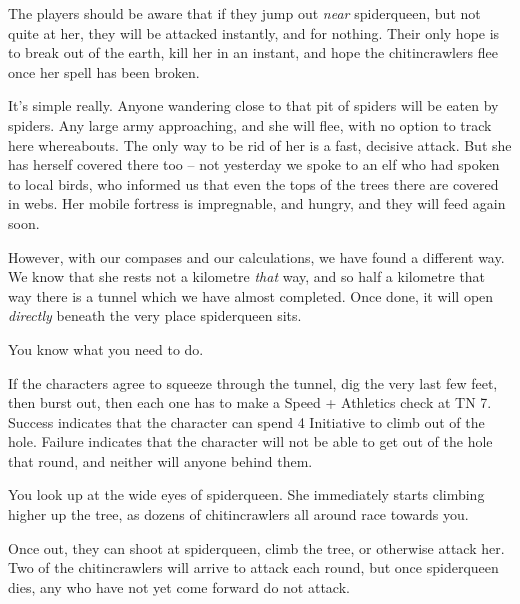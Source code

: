 \begin{multicols}{2}
The players should be aware that if they jump out \emph{near} \gls{spiderqueen}, but not quite at her, they will be attacked instantly, and for nothing.  Their only hope is to break out of the earth, kill her in an instant, and hope the chitincrawlers flee once her spell has been broken.

\begin{speechtext}

	It's simple really.  Anyone wandering close to that pit of spiders will be eaten by spiders.  Any large army approaching, and she will flee, with no option to track here whereabouts.  The only way to be rid of her is a fast, decisive attack.  But she has herself covered there too -- not yesterday we spoke to an elf who had spoken to local birds, who informed us that even the tops of the trees there are covered in webs.  Her mobile fortress is impregnable, and hungry, and they will feed again soon.

	However, with our compases and our calculations, we have found a different way.  We know that she rests not a kilometre \emph{that} way, and so half a kilometre that way there is a tunnel which we have almost completed.  Once done, it will open \emph{directly} beneath the very place \gls{spiderqueen} sits.

	You know what you need to do.

\end{speechtext}

If the characters agree to squeeze through the tunnel, dig the very last few feet, then burst out, then each one has to make a Speed + Athletics check at TN 7.  Success indicates that the character can spend 4 Initiative to climb out of the hole.  Failure indicates that the character will not be able to get out of the hole that round, and neither will anyone behind them.

\begin{boxtext}

	You look up at the wide eyes of \gls{spiderqueen}. She immediately starts climbing higher up the tree, as dozens of chitincrawlers all around race towards you.

\end{boxtext}

Once out, they can shoot at \gls{spiderqueen}, climb the tree, or otherwise attack her.  Two of the chitincrawlers will arrive to attack each round, but once \gls{spiderqueen} dies, any who have not yet come forward do not attack.



\end{multicols}
